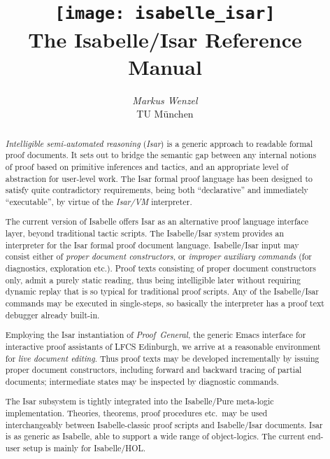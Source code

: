 \documentclass[12pt,fleqn]{report}
\title{\texttt{[image: isabelle\_isar]} \\[4ex] The Isabelle/Isar Reference Manual}
\author{\emph{Markus Wenzel} \\ TU M\"unchen}
\begin{document}
\underscoreoff

\maketitle 

\begin{abstract}
  \emph{Intelligible semi-automated reasoning} (\emph{Isar}) is a generic
  approach to readable formal proof documents.  It sets out to bridge the
  semantic gap between any internal notions of proof based on primitive
  inferences and tactics, and an appropriate level of abstraction for
  user-level work.  The Isar formal proof language has been designed to
  satisfy quite contradictory requirements, being both ``declarative'' and
  immediately ``executable'', by virtue of the \emph{Isar/VM} interpreter.
  
  The current version of Isabelle offers Isar as an alternative proof language
  interface layer, beyond traditional tactic scripts.  The Isabelle/Isar
  system provides an interpreter for the Isar formal proof document language.
  Isabelle/Isar input may consist either of \emph{proper document
    constructors}, or \emph{improper auxiliary commands} (for diagnostics,
  exploration etc.).  Proof texts consisting of proper document constructors
  only, admit a purely static reading, thus being intelligible later without
  requiring dynamic replay that is so typical for traditional proof scripts.
  Any of the Isabelle/Isar commands may be executed in single-steps, so
  basically the interpreter has a proof text debugger already built-in.
  
  Employing the Isar instantiation of \emph{Proof~General}, the generic Emacs
  interface for interactive proof assistants of LFCS Edinburgh, we arrive at a
  reasonable environment for \emph{live document editing}.  Thus proof texts
  may be developed incrementally by issuing proper document constructors,
  including forward and backward tracing of partial documents; intermediate
  states may be inspected by diagnostic commands.
  
  The Isar subsystem is tightly integrated into the Isabelle/Pure meta-logic
  implementation.  Theories, theorems, proof procedures etc.\ may be used
  interchangeably between Isabelle-classic proof scripts and Isabelle/Isar
  documents.  Isar is as generic as Isabelle, able to support a wide range of
  object-logics.  The current end-user setup is mainly for Isabelle/HOL.
\end{abstract}

 \tableofcontents \clearfirst

\nocite{Rudnicki:1992:MizarOverview}
\nocite{Harrison:1996:MizarHOL}
\nocite{Rudnicki:1992:MizarOverview}
\nocite{Trybulec:1993:MizarFeatures}
\nocite{Syme:1997:DECLARE}
\nocite{Syme:1998:thesis}
\nocite{Syme:1999:TPHOL}
\nocite{Wenzel:1999:TPHOL}








\begingroup
   \small\raggedright\frenchspacing
  
\endgroup


\end{document}
